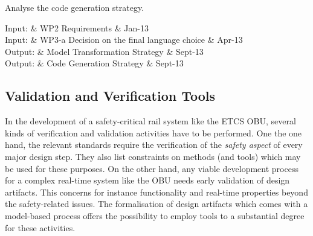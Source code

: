 \documentclass{template/openetcs_article}
\begin{document}
Analyse the code generation strategy.



%

\begin{inoutput}
Input: & WP2 Requirements & Jan-13 \\
\hline
Input: & WP3-a  Decision on the final language choice & Apr-13 \\
\hline
Output: & Model Transformation Strategy & Sept-13 \\
\hline
Output: & Code Generation Strategy & Sept-13 \\
\end{inoutput}


\subsection{Validation and Verification Tools}

In the development of a safety-critical rail system like the ETCS OBU,
several kinds of verification and validation activities have to be
performed. One the one hand, the relevant standards require the
verification of the \emph{safety aspect} of every major design
step. They also list constraints on methods (and tools) which may be used for these
purposes.  On the other hand, any viable development process for a
complex real-time system like the OBU needs early validation of design
artifacts. This concerns for instance functionality and real-time
properties beyond the safety-related issues. The formalisation of
design artifacts which comes with a model-based process offers the
possibility to employ tools to a substantial degree for these
activities. 
\end{document}
